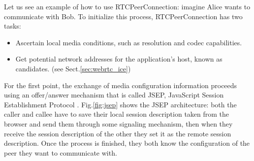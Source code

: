 Let us see an example of how to use RTCPeerConnection: imagine Alice wants to communicate with Bob. To initialize this process, RTCPeerConnection has two tasks:
\begin{itemize}
	\item Ascertain local media conditions, such as resolution and codec capabilities.
	\item Get potential network addresses for the application's host, known as candidates. (see Sect.\ref{sec:webrtc_ice})
\end{itemize}

For the first point, the exchange of media configuration information proceeds using an offer/answer mechanism that is called JSEP, JavaScript Session Establishment Protocol \cite{jsep}. Fig.\ref{fig:jsep} shows the JSEP architecture: both the caller and callee have to save their local session description taken from the browser and send them through some signaling mechanism, then when they receive the session description of the other they set it as the remote session description. Once the process is finished, they both know the configuration of the peer they want to communicate with.

